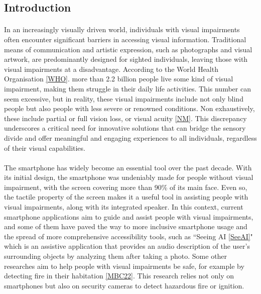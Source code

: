 \documentclass[12pt, letterpaper]{article}
\renewcommand{\listfigurename}{List of Figures}
\begin{document}
\begin{spacing}{1.15}

\listoffigures
\listoftables
\addcontentsline{toc}{section}{\listfigurename}

\newpage

\section{Introduction}

\paragraph{}
In an increasingly visually driven world, individuals with visual impairments often encounter significant barriers in accessing
visual information. Traditional means of communication and artistic expression, such as photographs and visual artwork, are predominantly
designed for sighted individuals, leaving those with visual impairments at a disadvantage. According to the World Health Organisation \hyperlink{WHOtarget}{[WHO]}. %
more than 2.2 billion people live some kind of visual impairment, making them struggle in their daily life activities. This number can seem
excessive, but in reality, these visual impairments include not only blind people but also people with less
severe or renowned conditions. Non exhaustively, these include partial or full vision loss, or visual acuity \hyperlink{NMtarget}{[NM]}. %
This discrepancy underscores a critical need for innovative solutions that can bridge the sensory divide and offer meaningful and engaging
experiences to all individuals, regardless of their visual capabilities.
\paragraph{}
The smartphone has widely become an essential tool over the past decade. With its initial design, the smartphone was undeniably made for
people without visual impairment, with the screen covering more than 90\% of its main face. Even so, the tactile property of the screen makes it
a useful tool in assisting people with visual impairments, along with its integrated speaker. In this context, current smartphone applications aim
to guide and assist people with visual impairments, and some of them have paved the way to more inclusive smartphone usage and the spread of more
comprehensive accessibility tools, such as ``Seeing AI \hyperlink{SeeAItarget}{[SeeAI]}" %
which is an assistive application that provides an audio description of the user's surrounding objects by analyzing them after taking a photo.
Some other researches aim to help people with visual impairments be safe, for example by detecting fire in their habitation \hyperlink{MBC22target}{[MBC22]}. %
This research relies not only on smartphones but also on security cameras to detect hazardous fire or ignition.

\end{spacing}
\end{document}
